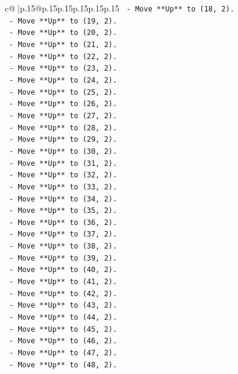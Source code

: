\documentclass{article}
\begin{document}
{\begin{supertabular}{c@{$\;$}|p{.15\linewidth}@{}p{.15\linewidth}p{.15\linewidth}p{.15\linewidth}p{.15\linewidth}p{.15\linewidth}}
{{{\texttt{    {-} Move **Up** to (18, 2).} \\
\texttt{    {-} Move **Up** to (19, 2).} \\
\texttt{    {-} Move **Up** to (20, 2).} \\
\texttt{    {-} Move **Up** to (21, 2).} \\
\texttt{    {-} Move **Up** to (22, 2).} \\
\texttt{    {-} Move **Up** to (23, 2).} \\
\texttt{    {-} Move **Up** to (24, 2).} \\
\texttt{    {-} Move **Up** to (25, 2).} \\
\texttt{    {-} Move **Up** to (26, 2).} \\
\texttt{    {-} Move **Up** to (27, 2).} \\
\texttt{    {-} Move **Up** to (28, 2).} \\
\texttt{    {-} Move **Up** to (29, 2).} \\
\texttt{    {-} Move **Up** to (30, 2).} \\
\texttt{    {-} Move **Up** to (31, 2).} \\
\texttt{    {-} Move **Up** to (32, 2).} \\
\texttt{    {-} Move **Up** to (33, 2).} \\
\texttt{    {-} Move **Up** to (34, 2).} \\
\texttt{    {-} Move **Up** to (35, 2).} \\
\texttt{    {-} Move **Up** to (36, 2).} \\
\texttt{    {-} Move **Up** to (37, 2).} \\
\texttt{    {-} Move **Up** to (38, 2).} \\
\texttt{    {-} Move **Up** to (39, 2).} \\
\texttt{    {-} Move **Up** to (40, 2).} \\
\texttt{    {-} Move **Up** to (41, 2).} \\
\texttt{    {-} Move **Up** to (42, 2).} \\
\texttt{    {-} Move **Up** to (43, 2).} \\
\texttt{    {-} Move **Up** to (44, 2).} \\
\texttt{    {-} Move **Up** to (45, 2).} \\
\texttt{    {-} Move **Up** to (46, 2).} \\
\texttt{    {-} Move **Up** to (47, 2).} \\
\texttt{    {-} Move **Up** to (48, 2).} \\
}}}
\end{supertabular}}
\end{document}
